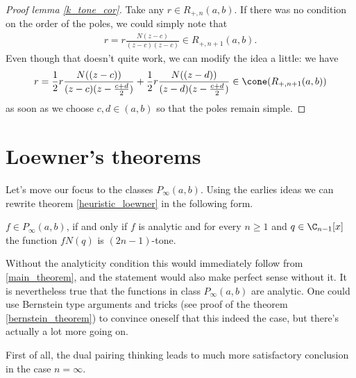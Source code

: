 \begin{proof}[Proof lemma \ref{k_tone_cor}]
	Take any $r \in R_{+, n}(a, b)$. If there was no condition on the order of the poles, we could simply note that
	\begin{align*}
		r = r \frac{N(z - c)}{(z - c) (z - c)} \in R_{+, n + 1}(a, b).
	\end{align*}
	Even though that doesn't quite work, we can modify the idea a little: we have
	\begin{align*}
		r = \frac{1}{2} r \frac{N((z - c))}{(z - c) (z - \frac{c + d}{2})} +  \frac{1}{2} r \frac{N((z - d))}{(z - d) (z - \frac{c + d}{2})} \in \cone(R_{+, n + 1}(a, b))
	\end{align*}
	as soon as we choose $c, d \in (a, b)$ so that the poles remain simple.
\end{proof}

\section{Loewner's theorems}

Let's move our focus to the classes $P_{\infty}(a, b)$. Using the earlies ideas we can rewrite theorem \ref{heuristic_loewner} in the following form.

\begin{lause}\label{better_loewner}
	$f \in P_{\infty}(a, b)$, if and only if $f$ is analytic and for every $n \geq 1$ and $q \in \C_{n - 1}[x]$ the function $f N(q)$ is $(2 n - 1)$-tone.
\end{lause}

Without the analyticity condition this would immediately follow from \ref{main_theorem}, and the statement would also make perfect sense without it. It is nevertheless true that the functions in class $P_{\infty}(a, b)$ are analytic. One could use Bernstein type arguments and tricks (see proof of the theorem \ref{bernstein_theorem}) to convince oneself that this indeed the case, but there's actually a lot more going on.

First of all, the dual pairing thinking leads to much more satisfactory conclusion in the case $n = \infty$.

